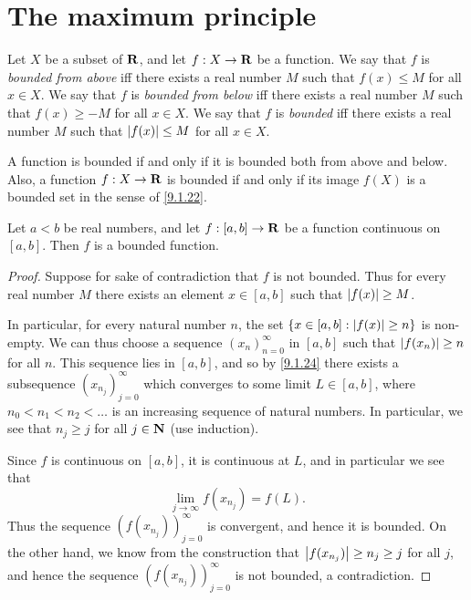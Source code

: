 \section{The maximum principle}\label{sec 9.6}

\begin{definition}\label{9.6.1}
  Let \(X\) be a subset of \(\mathbf{R}\), and let \(f : X \to \mathbf{R}\) be a function.
  We say that \(f\) is \emph{bounded from above} iff there exists a real number \(M\) such that \(f(x) \leq M\) for all \(x \in X\).
  We say that \(f\) is \emph{bounded from below} iff there exists a real number \(M\) such that \(f(x) \geq -M\) for all \(x \in X\).
  We say that \(f\) is \emph{bounded} iff there exists a real number \(M\) such that \(\left\lvert f(x)\right\rvert \leq M\) for all \(x \in X\).
\end{definition}

\begin{remark}\label{9.6.2}
  A function is bounded if and only if it is bounded both from above and below.
  Also, a function \(f : X \to \mathbf{R}\) is bounded if and only if its image \(f(X)\) is a bounded set in the sense of \cref{9.1.22}.
\end{remark}

\begin{lemma}\label{9.6.3}
  Let \(a < b\) be real numbers, and let \(f : [a, b] \to \mathbf{R}\) be a function continuous on \([a, b]\).
  Then \(f\) is a bounded function.
\end{lemma}

\begin{proof}
  Suppose for sake of contradiction that \(f\) is not bounded.
  Thus for every real number \(M\) there exists an element \(x \in [a, b]\) such that \(\left\lvert f(x)\right\rvert \geq M\).

  In particular, for every natural number \(n\), the set \(\{x \in [a, b] : \left\lvert f(x)\right\rvert \geq n\}\) is non-empty.
  We can thus choose a sequence \((x_n)_{n = 0}^\infty\) in \([a, b]\) such that \(\left\lvert f(x_n)\right\rvert \geq n\) for all \(n\).
  This sequence lies in \([a, b]\), and so by \cref{9.1.24} there exists a subsequence \((x_{n_j})_{j = 0}^\infty\) which converges to some limit \(L \in [a, b]\), where \(n_0 < n_1 < n_2 < \dots\) is an increasing sequence of natural numbers.
  In particular, we see that \(n_j \geq j\) for all \(j \in \mathbf{N}\) (use induction).

  Since \(f\) is continuous on \([a, b]\), it is continuous at \(L\), and in particular we see that
  \[
    \lim_{j \to \infty} f(x_{n_j}) = f(L).
  \]
  Thus the sequence \((f(x_{n_j}))_{j = 0}^\infty\) is convergent, and hence it is bounded.
  On the other hand, we know from the construction that \(\left\lvert f(x_{n_j})\right\rvert \geq n_j \geq j\) for all \(j\), and hence the sequence \((f(x_{n_j}))_{j = 0}^\infty\) is not bounded, a contradiction.
\end{proof}

